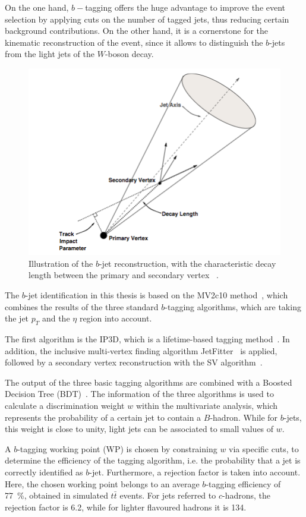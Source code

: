 On the one hand, $b-$tagging offers the huge advantage to improve the event selection by applying cuts on the number of tagged jets, thus reducing certain background contributions. On the other hand, it is a cornerstone for the kinematic reconstruction of the event, since it allows to distinguish the $b$-jets from the light jets of the $W$-boson decay. 

\begin{figure}[h]
	\centering
	\includegraphics[width=0.5\linewidth]{Pics/btag.png}
	\caption{ Illustration of the $b$-jet reconstruction, with the characteristic decay length between the primary and secondary vertex ~\cite{ATLAS:2010rza}.} 
	\label{fig:42}
\end{figure}

The $b$-jet identification in this thesis is based on the MV2c10 method~\cite{ATL-PHYS-PUB-2016-012}, which combines the results of the three standard  $b$-tagging algorithms, which are taking the jet $p_T$ and the $\eta$ region into account.

 The first algorithm is the IP3D, which is a lifetime-based tagging method~\cite{ATL-PHYS-PUB-2016-012}. In addition, the inclusive multi-vertex finding algorithm JetFitter~\cite{Piacquadio:2008zza} is applied, followed by a secondary vertex reconstruction with the SV algorithm~\cite{ATLAS-CONF-2011-102}.

 The output of the three basic  tagging algorithms are combined with a Boosted Decision Tree (BDT)~\cite{ATL-PHYS-PUB-2016-012}. 
The information of the three algorithms is 
 used to calculate a discrimination weight $w$ within the multivariate analysis, which represents  the probability of a certain jet  to contain a $B$-hadron.  While for $b$-jets, this weight is close to unity, light jets can be associated to small values of $w$.


 
A $b$-tagging working point (WP) is chosen by constraining $w$ via specific cuts, to determine the efficiency of the tagging algorithm, i.e. the probability that a jet is correctly identified as $b$-jet. 
 Furthermore, a rejection factor is taken into account.  Here, the chosen working point belongs to an average $b$-tagging efficiency of 77~\%, obtained in simulated $t\bar{t}$ events. For jets referred to  $c$-hadrons, the rejection factor is 6.2, while for lighter flavoured  hadrons it is 134. 
 



